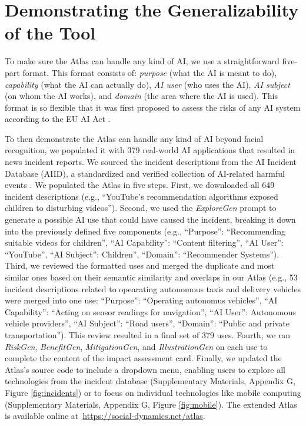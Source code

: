\section{Demonstrating the Generalizability of the Tool}
To make sure the Atlas can handle any kind of AI, we use a straightforward five-part format. This format consists of:
\emph{purpose} (what the AI is meant to do), \emph{capability} (what the AI can actually do), \emph{AI user} (who uses the AI), \emph{AI subject} (on whom the AI works), and \emph{domain} (the area where the AI is used). This format is so flexible that it was first proposed to assess the risks of any AI system according to the EU AI Act \cite{Golpayegani2023Risk}.

To then demonstrate the Atlas can handle any kind of AI  beyond facial recognition, we populated it with 379 real-world AI applications that resulted in news incident reports. We sourced the incident descriptions from the AI Incident Database (AIID), a standardized and verified collection of AI-related harmful events \cite{mcgregor2021preventing}. We populated the Atlas in five steps. First, we downloaded all 649 incident descriptions (e.g., ``YouTube's recommendation algorithms exposed children to disturbing videos''). Second, we used the \emph{ExploreGen} prompt to generate a possible AI use that could have caused the incident, breaking it down into the previously defined five components (e.g., ``Purpose'': ``Recommending suitable videos for children'', ``AI Capability'': ``Content filtering'', ``AI User'': ``YouTube'', ``AI Subject'': Children'', ``Domain'': ``Recommender Systems''). Third, we reviewed the formatted uses and merged the duplicate and most similar ones based on their semantic similarity and overlaps in our Atlas (e.g., 53 incident descriptions related to opearating autonomous taxis and delivery vehicles were merged into one use: ``Purpose'': ``Operating autonomus vehicles'', ``AI Capability'': ``Acting on sensor readings for navigation'', ``AI User'': Autonomous vehicle providers'', ``AI Subject'': ``Road users'', ``Domain'': ``Public and private transportation''). This review resulted in a final set of 379 uses. Fourth, we ran \emph{RiskGen}, \emph{BenefitGen}, \emph{MitigationGen}, and \emph{IllustrationGen} on each use to complete the content of the impact assessment card. Finally, we updated the Atlas's source code to include a dropdown menu, enabling users to explore all technologies from the incident database (Supplementary Materials, Appendix G, Figure \ref{fig:incidents}) or to focus on individual technologies like mobile computing (Supplementary Materials, Appendix G, Figure \ref{fig:mobile}). The extended Atlas is available online at~\url{https://social-dynamics.net/atlas}.

